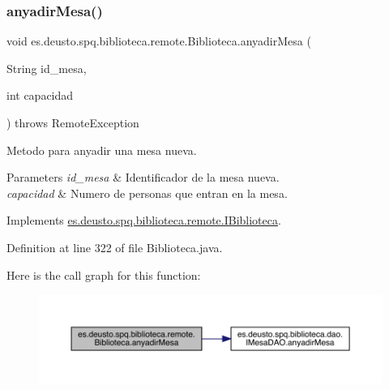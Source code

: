 \subsubsection{\texorpdfstring{anyadir\+Mesa()}{anyadirMesa()}}
{\footnotesize\ttfamily void es.\+deusto.\+spq.\+biblioteca.\+remote.\+Biblioteca.\+anyadir\+Mesa (\begin{DoxyParamCaption}\item[{String}]{id\+\_\+mesa,  }\item[{int}]{capacidad }\end{DoxyParamCaption}) throws Remote\+Exception}

Metodo para anyadir una mesa nueva. 
\begin{DoxyParams}{Parameters}
{\em id\+\_\+mesa} & Identificador de la mesa nueva. \\
\hline
{\em capacidad} & Numero de personas que entran en la mesa. \\
\hline
\end{DoxyParams}


Implements \mbox{\hyperlink{interfacees_1_1deusto_1_1spq_1_1biblioteca_1_1remote_1_1_i_biblioteca_a99ba473aaaa6ff064cff2f354c3f64b3}{es.\+deusto.\+spq.\+biblioteca.\+remote.\+I\+Biblioteca}}.



Definition at line 322 of file Biblioteca.\+java.

Here is the call graph for this function\+:
\nopagebreak
\begin{figure}[H]
\begin{center}
\leavevmode
\includegraphics[width=350pt]{classes_1_1deusto_1_1spq_1_1biblioteca_1_1remote_1_1_biblioteca_a5cfc021da6e151681f153a974177d2e7_cgraph}
\end{center}
\end{figure}
\mbox{\label{classes_1_1deusto_1_1spq_1_1biblioteca_1_1remote_1_1_biblioteca_a14548a38ca53ad1037d16687093e4597}} 
